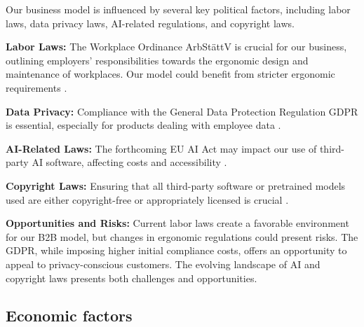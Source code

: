 Our business model is influenced by several key political factors, including labor laws, data privacy laws, AI-related regulations, and copyright laws.

\textbf{Labor Laws:} The Workplace Ordinance ArbStättV is crucial for our business, outlining employers' responsibilities towards the ergonomic design and maintenance of workplaces. Our model could benefit from stricter ergonomic requirements \autocite{ArbStattV}.

\textbf{Data Privacy:} Compliance with the General Data Protection Regulation GDPR is essential, especially for products dealing with employee data \autocite{GDPR}.

\textbf{AI-Related Laws:} The forthcoming EU AI Act may impact our use of third-party AI software, affecting costs and accessibility \autocite{EUAIACT}.

\textbf{Copyright Laws:} Ensuring that all third-party software or pretrained models used are either copyright-free or appropriately licensed is crucial \autocite{CopyrightLaws}.

\textbf{Opportunities and Risks:} Current labor laws create a favorable environment for our B2B model, but changes in ergonomic regulations could present risks. The GDPR, while imposing higher initial compliance costs, offers an opportunity to appeal to privacy-conscious customers. The evolving landscape of AI and copyright laws presents both challenges and opportunities.


\subsection{Economic factors}

